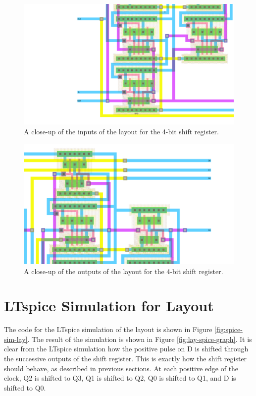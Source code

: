 \documentclass{article}
\begin{document}
  \begin{figure}[H]
    \centering
    \includegraphics[width=\linewidth, frame]{screenshots/lay-in.png}
    \caption{A close-up of the inputs of the layout for the 4-bit shift register.}
    \label{fig:lay-in}
  \end{figure}

  \begin{figure}[H]
    \centering
    \includegraphics[width=\linewidth, frame]{screenshots/lay-out.png}
    \caption{A close-up of the outputs of the layout for the 4-bit shift register.}
    \label{fig:lay-out}
  \end{figure}

\section{LTspice Simulation for Layout}
  \paragraph{}
  The code for the LTspice simulation of the layout is shown in Figure \ref{fig:spice-sim-lay}. The result of the simulation is shown in Figure \ref{fig:lay-spice-graph}. It is clear from the LTspice simulation how the positive pulse on D is shifted through the successive outputs of the shift register. This is exactly how the shift register should behave, as described in previous sections. At each positive edge of the clock, Q2 is shifted to Q3, Q1 is shifted to Q2, Q0 is shifted to Q1, and D is shifted to Q0. 
\end{document}

